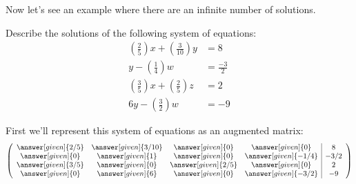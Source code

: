 \documentclass{ximera}
\begin{document}
Now let's see an example where there are an infinite number of solutions.


\begin{example}
  Describe the solutions of the following system of equations:
\begin{align*}
\left(\frac{2}{5}\right)x + \left(\frac{3}{10}\right) y &= 8\\
y -\left(\frac{1}{4}\right)w &= \frac{-3}{2}\\
\left(\frac{3}{5}\right)x + \left(\frac{2}{5}\right)z &= 2\\
6y - \left(\frac{3}{2}\right)w &= -9
\end{align*}
\begin{explanation}
First we'll represent this system of equations as an augmented matrix:
\[
  \left(
    \begin{array}{cccc|c}
      \answer[given]{2/5}&  \answer[given]{3/10} & \answer[given]{0} &\answer[given]{0} &8 \\
      \answer[given]{0}&  \answer[given]{1} & \answer[given]{0} &\answer[given]{-1/4} & -3/2\\
      \answer[given]{3/5}&  \answer[given]{0} & \answer[given]{2/5} &\answer[given]{0} &2\\
      \answer[given]{0}&  \answer[given]{6} & \answer[given]{0} &\answer[given]{-3/2} &-9
    \end{array}
  \right)
\]


\end{explanation}
\end{example}
\end{document}
